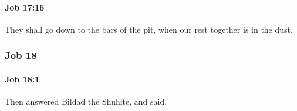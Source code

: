 		\paragraph{Job 17:16} %
			\label{JOB-17-16}

			They shall go down to the bars of the pit, when our rest together is in the dust.

	\subsubsection{Job 18} %
		\label{JOB-18}

		\paragraph{Job 18:1} %
			\label{JOB-18-1}

			Then answered Bildad the Shuhite, and said,


